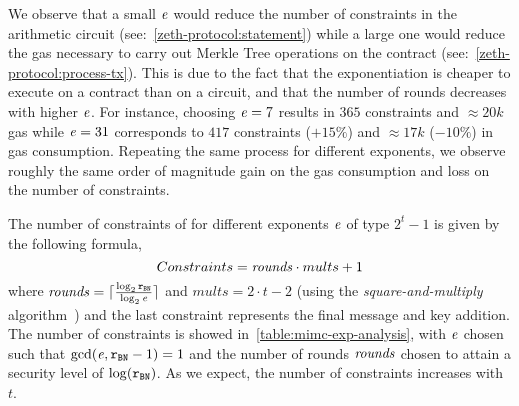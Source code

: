 We observe that a small $\mathit{e}{}$ would reduce the number of constraints in the arithmetic circuit (see:~\cref{zeth-protocol:statement}) while a large one would reduce the gas necessary to carry out Merkle Tree operations on the contract (see:~\cref{zeth-protocol:process-tx}). This is due to the fact that the exponentiation is cheaper to execute on a contract than on a circuit, and that the number of rounds decreases with higher $\mathit{e}{}$. For instance, choosing $\mathit{e}{} = 7$ results in $365$ constraints and $\approx 20k$ gas while $\mathit{e}{} = 31$ corresponds to $417$ constraints ($+15\%$) and $\approx 17k$ ($-10\%$) in gas consumption. Repeating the same process for different exponents, we observe roughly the same order of magnitude gain on the gas consumption and loss on the number of constraints.

The number of constraints of \mimcMPPrime{} for different exponents $\mathit{e}{}$ of type $2^t-1$ is given by the following formula,
\[
    Constraints = \mathit{rounds} \cdot mults + 1
\]
where $\mathit{rounds} = \lceil \frac{\log_2 \mathtt{r_{BN}}}{\log_2 \mathit{e}{}} \rceil$ and $mults = 2 \cdot t - 2$ (using the \emph{square-and-multiply} algorithm~\cite[14.06]{menezes1996handbook}) and the last constraint represents the final message and key addition. The number of constraints is showed in~\cref{table:mimc-exp-analysis}, with $\mathit{e}{}$ chosen such that $\gcd(\mathit{e}{},\mathtt{r_{BN}} - 1) = 1$ and the number of rounds $\mathit{rounds}$ chosen to attain a security level of $\log(\mathtt{r_{BN}})$. As we expect, the number of constraints increases with $t$.

